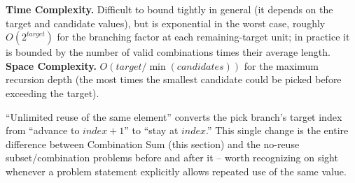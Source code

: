 \begin{complexitybox}
\textbf{Time Complexity.} Difficult to bound tightly in general (it
depends on the target and candidate values), but is exponential in the
worst case, roughly $O(2^{\textit{target}})$ for the branching factor at
each remaining-target unit; in practice it is bounded by the number of
valid combinations times their average length.
\textbf{Space Complexity.} $O(\textit{target}/\min(\textit{candidates}))$
for the maximum recursion depth (the most times the smallest candidate
could be picked before exceeding the target).
\end{complexitybox}

\begin{takeawaybox}
``Unlimited reuse of the same element'' converts the pick branch's
target index from ``advance to $\textit{index}+1$'' to ``stay at
$\textit{index}$.'' This single change is the entire difference between
Combination Sum (this section) and the no-reuse subset/combination
problems before and after it -- worth recognizing on sight whenever a
problem statement explicitly allows repeated use of the same value.
\end{takeawaybox}
